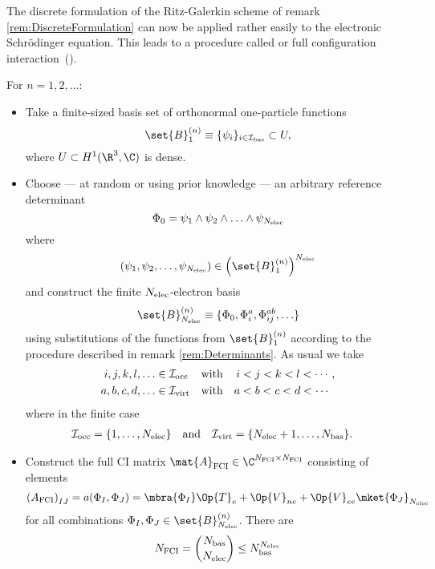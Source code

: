 \newcommand{\Nfci}{N_\text{FCI}}
\begin{rem}[Full CI]
	\label{rem:FCI}
	The discrete formulation of the Ritz-Galerkin scheme
	of remark \vref{rem:DiscreteFormulation}
	can now be applied rather easily to the electronic Schrödinger equation.
	This leads to a procedure called 
	or full configuration interaction~(\FCI).

	\pagebreak[3]
	\noindent
	For $n = 1, 2, \ldots$:
	\begin{itemize}
	\item Take a finite-sized basis set of orthonormal one-particle functions
	\[ \set{B}_1^{(n)} \equiv \{\psi_i\}_{i \in \Ibas} \subset U, \]
	where $U \subset H^1(\R^3, \C)$ is dense.
	\item Choose --- at random or using prior knowledge ---
		an arbitrary reference determinant
	\[ \Phi_0 = \psi_1 \wedge \psi_2 \wedge \ldots \wedge \psi_{N_\text{elec}} \]
	where
	\[ (\psi_1, \psi_2, \ldots, \psi_{\Nelec}) \in \left(\set{B}_1^{(n)}\right)^{\Nelec} \]
	and construct the finite $N_\text{elec}$-electron basis
	\begin{equation}
		\set{B}_{\Nelec}^{(n)} \equiv \{ \Phi_0, \Phi_i^a, \Phi_{ij}^{ab}, \ldots \}
		\label{eqn:NelectronBasisFinite}
	\end{equation}
	using substitutions of the functions from $\set{B}_1^{(n)}$
	according to the procedure described in remark \vref{rem:Determinants}.
	As usual we take
	\begin{align}
		\label{eqn:CondOccIndex}
		i, j, k, l, \ldots &\in \mathcal{I}_\text{occ} &&\text{with}& i&<j<k<l<\cdots, \\
		\label{eqn:CondVirtIndex}
		a, b, c, d, \ldots &\in \mathcal{I}_\text{virt} &&\text{with}& a&<b<c<d<\cdots
	\end{align}
	where in the finite case
	\begin{align*}
		\mathcal{I}_\text{occ} &= \{1, \ldots, N_\text{elec}\} &&\text{and}& \mathcal{I}_\text{virt} &= \{ N_\text{elec} + 1, \ldots, N_\text{bas} \}.
	\end{align*}
	\item Construct the full CI matrix $\mat{A}_\text{FCI} \in \C^{\Nfci \times \Nfci}$
		consisting of elements
		\begin{equation}
			\left(A_\text{FCI}\right)_{IJ}
			= a(\Phi_I, \Phi_J)
			= \mbra{\Phi_I}
			\Op{T}_e + \Op{V}_{ne} + \Op{V}_{ee}
			\mket{\Phi_J}_{\Nelec}
			\label{eqn:FCIMatrixElements}
		\end{equation}
		for all combinations $\Phi_I, \Phi_J \in \set{B}_{\Nelec}^{(n)}$.
		There are
		\[ \Nfci = \binom{\Nbas}{\Nelec} \leq \Nbas^{\Nelec} \]

\end{itemize}
\end{rem}
